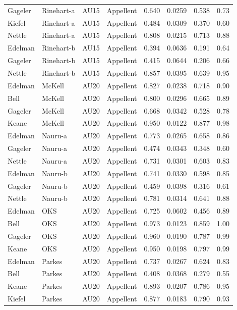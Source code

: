 \documentclass{monashthesis}
\begin{document}
\begin{center}
\begin{longtable}{llllllll}
Gageler & Rinehart-a & AU15 & Appellent & 0.640 & 0.0259 & 0.538 & 0.73 \\
Kiefel & Rinehart-a & AU15 & Appellent & 0.484 & 0.0309 & 0.370 & 0.60 \\
Nettle & Rinehart-a & AU15 & Appellent & 0.808 & 0.0215 & 0.713 & 0.88 \\
Edelman & Rinehart-b & AU15 & Appellent & 0.394 & 0.0636 & 0.191 & 0.64 \\
Gageler & Rinehart-b & AU15 & Appellent & 0.415 & 0.0644 & 0.206 & 0.66 \\
Nettle & Rinehart-b & AU15 & Appellent & 0.857 & 0.0395 & 0.639 & 0.95 \\
Edelman & McKell & AU20 & Appellent & 0.827 & 0.0238 & 0.718 & 0.90 \\
Bell & McKell & AU20 & Appellent & 0.800 & 0.0296 & 0.665 & 0.89 \\
Gageler & McKell & AU20 & Appellent & 0.668 & 0.0342 & 0.528 & 0.78 \\
Keane & McKell & AU20 & Appellent & 0.950 & 0.0122 & 0.877 & 0.98 \\
Edelman & Nauru-a & AU20 & Appellent & 0.773 & 0.0265 & 0.658 & 0.86 \\
Gageler & Nauru-a & AU20 & Appellent & 0.474 & 0.0343 & 0.348 & 0.60 \\
Nettle & Nauru-a & AU20 & Appellent & 0.731 & 0.0301 & 0.603 & 0.83 \\
Edelman & Nauru-b & AU20 & Appellent & 0.741 & 0.0330 & 0.598 & 0.85 \\
Gageler & Nauru-b & AU20 & Appellent & 0.459 & 0.0398 & 0.316 & 0.61 \\
Nettle & Nauru-b & AU20 & Appellent & 0.781 & 0.0314 & 0.641 & 0.88 \\
Edelman & OKS & AU20 & Appellent & 0.725 & 0.0602 & 0.456 & 0.89 \\
Bell & OKS & AU20 & Appellent & 0.973 & 0.0123 & 0.859 & 1.00 \\
Gageler & OKS & AU20 & Appellent & 0.960 & 0.0190 & 0.787 & 0.99 \\
Keane & OKS & AU20 & Appellent & 0.950 & 0.0198 & 0.797 & 0.99 \\
Edelman & Parkes & AU20 & Appellent & 0.737 & 0.0267 & 0.624 & 0.83 \\
Bell & Parkes & AU20 & Appellent & 0.408 & 0.0368 & 0.279 & 0.55 \\
Keane & Parkes & AU20 & Appellent & 0.893 & 0.0207 & 0.786 & 0.95 \\
Kiefel & Parkes & AU20 & Appellent & 0.877 & 0.0183 & 0.790 & 0.93 \\

\end{longtable}
\end{center}
\end{document}
